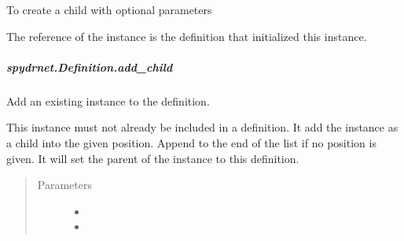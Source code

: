 \documentclass[letterpaper,10pt,english,openany,oneside]{sphinxmanual}
\begin{document}
\begin{fulllineitems}
To create a child with optional parameters

\begin{sphinxVerbatim}[commandchars=\\\{\}]
   
\end{sphinxVerbatim}

The reference of the instance is the definition that initialized this instance.

\end{fulllineitems}



\subparagraph{spydrnet.Definition.add\_child}
\label{\detokenize{reference/classes/generated/spydrnet.Definition.add_child:spydrnet-definition-add-child}}\label{\detokenize{reference/classes/generated/spydrnet.Definition.add_child::doc}}

\begin{fulllineitems}
\label{\detokenize{reference/classes/generated/spydrnet.Definition.add_child:spydrnet.Definition.add_child}}
Add an existing instance to the definition.

This instance must not already be included in a definition.
It add the instance as a child into the given position.
Append to the end of the list if no position is given.
It will set the parent of the instance to this definition.
\begin{quote}\begin{description}
\item[{Parameters}] \leavevmode\begin{itemize}
\item {} 

\item {} 

\end{itemize}

\end{description}\end{quote}

\end{fulllineitems}
\end{document}
